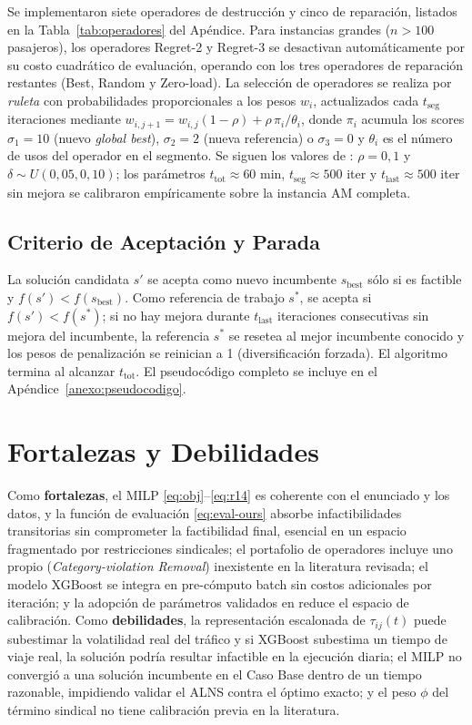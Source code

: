 Se implementaron siete operadores de destrucción y cinco de reparación, listados en la Tabla~\ref{tab:operadores} del Apéndice. Para instancias grandes ($n > 100$ pasajeros), los operadores Regret-2 y Regret-3 se desactivan automáticamente por su costo cuadrático de evaluación, operando con los tres operadores de reparación restantes (Best, Random y Zero-load). La selección de operadores se realiza por \textit{ruleta} con probabilidades proporcionales a los pesos $w_i$, actualizados cada $t_{\mathrm{seg}}$ iteraciones mediante $w_{i,j+1}=w_{i,j}(1-\rho)+\rho\,\pi_i/\theta_i$, donde $\pi_i$ acumula los scores $\sigma_1=10$ (nuevo \textit{global best}), $\sigma_2=2$ (nueva referencia) o $\sigma_3=0$ y $\theta_i$ es el número de usos del operador en el segmento. Se siguen los valores de \cite{Pilati2025}: $\rho=0{,}1$ y $\delta\sim U(0{,}05,0{,}10)$; los parámetros $t_{\mathrm{tot}} \approx 60$ min, $t_{\mathrm{seg}} \approx 500$ iter y $t_{\mathrm{last}} \approx 500$ iter sin mejora se calibraron empíricamente sobre la instancia AM completa.

\subsection{Criterio de Aceptación y Parada}
La solución candidata $s'$ se acepta como nuevo incumbente $s_{\text{best}}$ sólo si es factible y $f(s')<f(s_{\text{best}})$. Como referencia de trabajo $s^*$, se acepta si $f(s')<f(s^*)$; si no hay mejora durante $t_{\mathrm{last}}$ iteraciones consecutivas sin mejora del incumbente, la referencia $s^*$ se resetea al mejor incumbente conocido y los pesos de penalización se reinician a 1 (diversificación forzada). El algoritmo termina al alcanzar $t_{\mathrm{tot}}$. El pseudocódigo completo se incluye en el Apéndice~\ref{anexo:pseudocodigo}.

\section{Fortalezas y Debilidades}

Como \textbf{fortalezas}, el MILP \eqref{eq:obj}--\eqref{eq:r14} es coherente con el enunciado y los datos, y la función de evaluación \eqref{eq:eval-ours} absorbe infactibilidades transitorias sin comprometer la factibilidad final, esencial en un espacio fragmentado por restricciones sindicales; el portafolio de operadores incluye uno propio (\textit{Category-violation Removal}) inexistente en la literatura revisada; el modelo XGBoost se integra en pre-cómputo batch sin costos adicionales por iteración; y la adopción de parámetros validados en \cite{Pilati2025} reduce el espacio de calibración. Como \textbf{debilidades}, la representación escalonada de $\tau_{ij}(t)$ puede subestimar la volatilidad real del tráfico y si XGBoost subestima un tiempo de viaje real, la solución podría resultar infactible en la ejecución diaria; el MILP no convergió a una solución incumbente en el Caso Base dentro de un tiempo razonable, impidiendo validar el ALNS contra el óptimo exacto; y el peso $\phi$ del término sindical no tiene calibración previa en la literatura.
